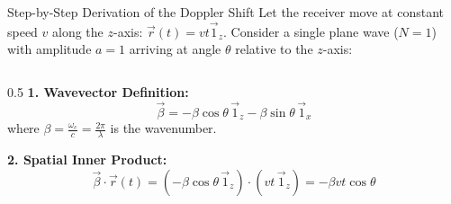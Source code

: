 \documentclass[aspectratio=169, 10pt]{beamer}
\begin{document}
\begin{frame}{Step-by-Step Derivation of the Doppler Shift}
    Let the receiver move at constant speed $v$ along the $z$-axis: $\vec{r}(t) = v t \vec{1}_z$.
    Consider a single plane wave ($N=1$) with amplitude $a=1$ arriving at angle $\theta$ relative to the $z$-axis:

    \begin{columns}[T]
        \begin{column}{0.5\textwidth}
            \textbf{1. Wavevector Definition:}
            \begin{equation}
                \vec{\beta} = -\beta \cos\theta \, \vec{1}_z - \beta \sin\theta \, \vec{1}_x
            \end{equation}
            where $\beta = \frac{\omega_c}{c} = \frac{2\pi}{\lambda}$ is the wavenumber.

            \textbf{2. Spatial Inner Product:}
            \begin{equation}
                \vec{\beta} \cdot \vec{r}(t) = \left( -\beta \cos\theta \, \vec{1}_z \right) \cdot \left( v t \, \vec{1}_z \right) = -\beta v t \cos\theta
            \end{equation}


\end{column}
\end{columns}
\end{frame}
\end{document}
